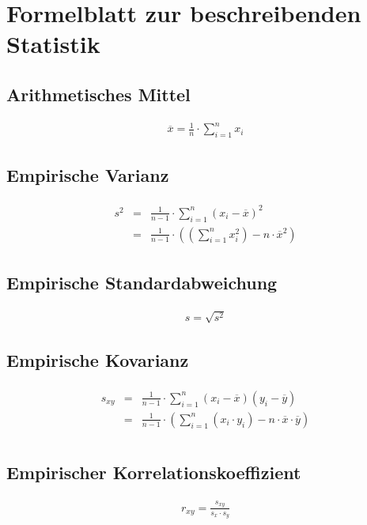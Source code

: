 \section{Formelblatt zur beschreibenden Statistik}

\subsection{Arithmetisches Mittel}
\begin{align*}
\overline{x} = \frac{1}{n} \cdot \sum_{i=1}^{n} x_i
\end{align*}

\subsection{Empirische Varianz}
\begin{align*}
\begin{array}{ccl}
s^2 &=& \frac{1}{n-1} \cdot \sum_{i=1}^{n} (x_i - \overline{x})^2\\
\mbox{} &=& \frac{1}{n-1} \cdot ((\sum_{i=1}^{n} x_i^2) - n \cdot \overline{x}^2)
\end{array}
\end{align*}

\subsection{Empirische Standardabweichung}
\begin{align*}
s = \sqrt{s^2}
\end{align*}

\subsection{Empirische Kovarianz}
\begin{align*}
\begin{array}{ccl}
s_{xy} &=& \frac{1}{n-1} \cdot \sum_{i=1}^{n} (x_i-\overline{x})(y_i-\overline{y})\\
\mbox{} &=& \frac{1}{n-1} \cdot (\sum_{i=1}^{n} (x_i \cdot y_i) - n \cdot \overline{x} \cdot \overline{y})\\
\end{array}
\end{align*}

\subsection{Empirischer Korrelationskoeffizient}
\begin{align*}
r_{xy} = \frac{s_{xy}}{s_x \cdot s_y}
\end{align*}

